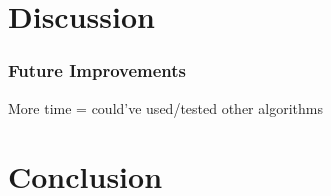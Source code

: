 \documentclass[11pt,oneside]{book}
\begin{document}
\chapter{Discussion}

\subsection{Future Improvements}
More time = could've used/tested other algorithms

\chapter{Conclusion}




 
 



\begin{appendices}


\end{appendices}
\end{document}

